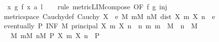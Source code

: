 \begin{isabellebody}
\ \ \ {\isachardoublequoteopen}{\isacharparenleft}{\kern0pt}{\isasymlambda}x{\isachardot}{\kern0pt}\ g\ {\isacharparenleft}{\kern0pt}f\ x{\isacharparenright}{\kern0pt}{\isacharparenright}{\kern0pt}\ {\isasymmidarrow}a{\isasymrightarrow}\ l{\isachardoublequoteclose}\isanewline
%
\isadelimproof
\ \ %
\endisadelimproof
%
\isatagproof
{}\isamarkupfalse%
\ {\isacharparenleft}{\kern0pt}rule\ metric{\isacharunderscore}{\kern0pt}LIM{\isacharunderscore}{\kern0pt}compose{}\ {\isacharbrackleft}{\kern0pt}OF\ f\ g\ inj{\isacharbrackright}{\kern0pt}{\isacharparenright}{\kern0pt}%
\endisatagproof
{\isafoldproof}%
%
\isadelimproof
%
\endisadelimproof
%
\isadelimdocument
%
\endisadelimdocument
%
\isatagdocument
%
\isamarkuptrue%
%
\isamarkuptrue%
%
\endisatagdocument
{\isafolddocument}%
%
\isadelimdocument
%
\endisadelimdocument
{}\isamarkupfalse%
\ {\isacharparenleft}{\kern0pt}\ metric{\isacharunderscore}{\kern0pt}space{\isacharparenright}{\kern0pt}\ Cauchy{\isacharunderscore}{\kern0pt}def{\isacharcolon}{\kern0pt}\ {\isachardoublequoteopen}Cauchy\ X\ {\isacharequal}{\kern0pt}\ {\isacharparenleft}{\kern0pt}{\isasymforall}e{\isachargreater}{\kern0pt}{}{\isachardot}{\kern0pt}\ {\isasymexists}M{\isachardot}{\kern0pt}\ {\isasymforall}m{\isasymge}M{\isachardot}{\kern0pt}\ {\isasymforall}n{\isasymge}M{\isachardot}{\kern0pt}\ dist\ {\isacharparenleft}{\kern0pt}X\ m{\isacharparenright}{\kern0pt}\ {\isacharparenleft}{\kern0pt}X\ n{\isacharparenright}{\kern0pt}\ {\isacharless}{\kern0pt}\ e{\isacharparenright}{\kern0pt}{\isachardoublequoteclose}\isanewline
%
\isadelimproof
%
\endisadelimproof
%
\isatagproof
{}\isamarkupfalse%
\ {\isacharminus}{\kern0pt}\isanewline
\ \ \isamarkupfalse%
\ {\isacharasterisk}{\kern0pt}{\isacharcolon}{\kern0pt}\ {\isachardoublequoteopen}eventually\ P\ {\isacharparenleft}{\kern0pt}INF\ M{\isachardot}{\kern0pt}\ principal\ {\isacharbraceleft}{\kern0pt}{\isacharparenleft}{\kern0pt}X\ m{\isacharcomma}{\kern0pt}\ X\ n{\isacharparenright}{\kern0pt}\ {\isacharbar}{\kern0pt}\ n\ m{\isachardot}{\kern0pt}\ m\ {\isasymge}\ M\ {\isasymand}\ n\ {\isasymge}\ M{\isacharbraceright}{\kern0pt}{\isacharparenright}{\kern0pt}\ {\isasymlongleftrightarrow}\isanewline
\ \ \ \ {\isacharparenleft}{\kern0pt}{\isasymexists}M{\isachardot}{\kern0pt}\ {\isasymforall}m{\isasymge}M{\isachardot}{\kern0pt}\ {\isasymforall}n{\isasymge}M{\isachardot}{\kern0pt}\ P\ {\isacharparenleft}{\kern0pt}X\ m{\isacharcomma}{\kern0pt}\ X\ n{\isacharparenright}{\kern0pt}{\isacharparenright}{\kern0pt}{\isachardoublequoteclose}\ \ P\isanewline

\end{isabellebody}
